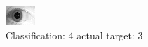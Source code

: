 \begin{figure}[h!]
\begin{center}
\includegraphics[width=0.60\columnwidth]{figures/ID1855_class_4_target_3.png}
\end{center}
\caption{ Classification: 4 actual target: 3}
\label{fig:ID1855_class_4_target_3}
\end{figure}
